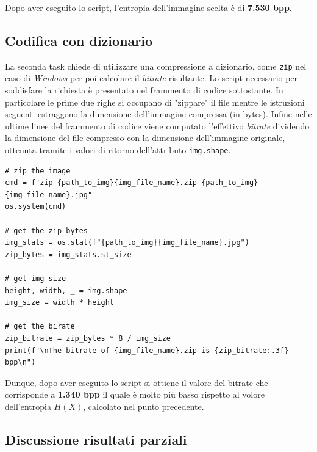 \noindent Dopo aver eseguito lo script, l'entropia dell'immagine scelta è di \textbf{7.530 bpp}.





\vspace{15px}\subsection{Codifica con dizionario}
La seconda task chiede di utilizzare una compressione a dizionario, come \texttt{zip} nel caso di \textsl{Windows} per poi calcolare il \textsl{bitrate} risultante. Lo script necessario per soddisfare la richiesta è presentato nel frammento di codice sottostante. In particolare le prime due righe si occupano di "zippare" il file mentre le istruzioni seguenti estraggono la dimensione dell'immagine compressa (in bytes). Infine nelle ultime linee del frammento di codice viene computato l'effettivo \textsl{bitrate} dividendo la dimensione del file compresso con la dimensione dell'immagine originale, ottenuta tramite i valori di ritorno dell'attributo \texttt{img.shape}.

\begin{lstlisting}
# zip the image
cmd = f"zip {path_to_img}{img_file_name}.zip {path_to_img}{img_file_name}.jpg"
os.system(cmd)

# get the zip bytes
img_stats = os.stat(f"{path_to_img}{img_file_name}.jpg")
zip_bytes = img_stats.st_size

# get img size
height, width, _ = img.shape
img_size = width * height

# get the birate
zip_bitrate = zip_bytes * 8 / img_size 
print(f"\nThe bitrate of {img_file_name}.zip is {zip_bitrate:.3f} bpp\n")
\end{lstlisting}

\noindent Dunque, dopo aver eseguito lo script si ottiene il valore del bitrate che corrisponde a \textbf{1.340 bpp} il quale è molto più basso rispetto al volore dell'entropia $H(X)$, calcolato nel punto precedente.





\vspace{15px}\subsection{Discussione risultati parziali}





